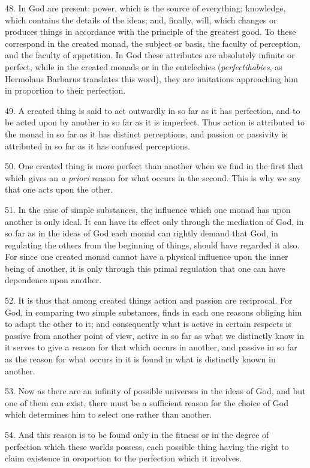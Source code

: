 48. In God are present: power, which is the source of everything;
knowledge, which contains the details of the ideas; and, finally,
will, which changes or produces things in accordance with the
principle of the greatest good. To these correspond in the created
monad, the subject or basis, the faculty of perception, and the
faculty of appetition. In God these attributes are absolutely infinite
or perfect, while in the created monads or in the entelechies
(\textit{perfectihabies}, as Hermolaus Barbarus translates this
word), they are imitations approaching him in proportion to their
perfection.

49. A created thing is said to act outwardly in so far as it has
perfection, and to be acted upon by another in so far as it is
imperfect. Thus action is attributed to the monad in so far as it has
distinct perceptions, and passion or passivity is attributed in so far
as it has confused perceptions.

50. One created thing is more perfect than another when we find in the
first that which gives an \textit{a priori} reason for what occurs in
the second. This is why we say that one acts upon the other.

51. In the case of simple substances, the influence which one monad
has upon another is only ideal. It  can have its effect only
through the mediation of God, in so far as in the ideas of God each
monad can rightly demand that God, in regulating the others from the
beginning of things, should have regarded it also. For since one
created monad cannot have a physical influence upon the inner being of
another, it is only through this primal regulation that one can have
dependence upon another.

52. It is thus that among created things action and passion are
reciprocal. For God, in comparing two simple substances, finds in each
one reasons obliging him to adapt the other to it; and consequently
what is active in certain respects is passive from another point of
view, active in so far as what we distinctly know in it serves to give
a reason for that which occurs in another, and passive in so far as
the reason for what occurs in it is found in what is distinctly known
in another.

53. Now as there are an infinity of possible universes in the ideas of
God, and but one of them can exist, there must be a sufficient reason
for the choice of God which determines him to select one rather than
another.

54. And this reason is to be found only in the fitness or in the
degree of perfection which these worlds possess, each possible thing
having the right to claim existence in oroportion to the perfection
which it involves.

